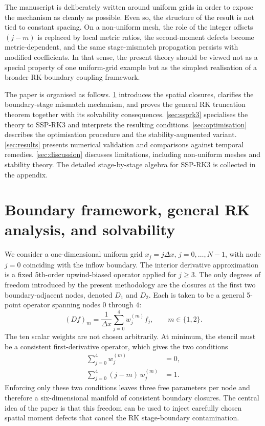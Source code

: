 \documentclass[review,hidelinks,onefignum,onetabnum]{siamart251216}
\newcommand{\Dx}{\Delta x}
\begin{document}
The manuscript is deliberately written around uniform grids in order to expose the mechanism as cleanly as possible. Even so, the structure of the result is not tied to constant spacing. On a non-uniform mesh, the role of the integer offsets $(j-m)$ is replaced by local metric ratios, the second-moment defects become metric-dependent, and the same stage-mismatch propagation persists with modified coefficients. In that sense, the present theory should be viewed not as a special property of one uniform-grid example but as the simplest realisation of a broader RK-boundary coupling framework.

The paper is organised as follows. \cref{sec:framework} introduces the spatial closures, clarifies the boundary-stage mismatch mechanism, and proves the general RK truncation theorem together with its solvability consequences. \cref{sec:ssprk3} specialises the theory to SSP-RK3 and interprets the resulting conditions. \cref{sec:optimisation} describes the optimisation procedure and the stability-augmented variant. \cref{sec:results} presents numerical validation and comparisons against temporal remedies. \cref{sec:discussion} discusses limitations, including non-uniform meshes and stability theory. The detailed stage-by-stage algebra for SSP-RK3 is collected in the appendix.

\section{Boundary framework, general RK analysis, and solvability}
\label{sec:framework}

We consider a one-dimensional uniform grid $x_j=j\Dx$, $j=0,\dots,N-1$, with node $j=0$ coinciding with the inflow boundary. The interior derivative approximation is a fixed 5th-order upwind-biased operator applied for $j\ge 3$. The only degrees of freedom introduced by the present methodology are the closures at the first two boundary-adjacent nodes, denoted $D_1$ and $D_2$. Each is taken to be a general 5-point operator spanning nodes $0$ through $4$:
\begin{equation}
  (Df)_m = \frac{1}{\Dx}\sum_{j=0}^{4} w^{(m)}_j f_j, \qquad m\in\{1,2\}.
  \label{eq:stencil-def}
\end{equation}
The ten scalar weights are not chosen arbitrarily. At minimum, the stencil must be a consistent first-derivative operator, which gives the two conditions
\begin{align}
  \sum_{j=0}^{4} w^{(m)}_j &= 0,
  \label{eq:cons0}\\
  \sum_{j=0}^{4}(j-m)\,w^{(m)}_j &= 1.
  \label{eq:cons1}
\end{align}
Enforcing only these two conditions leaves three free parameters per node and therefore a six-dimensional manifold of consistent boundary closures. The central idea of the paper is that this freedom can be used to inject carefully chosen spatial moment defects that cancel the RK stage-boundary contamination.
\end{document}
